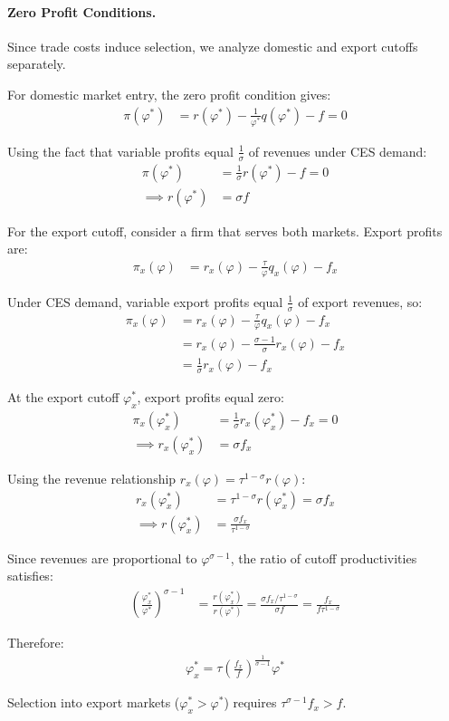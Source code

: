 \begin{solution}
	\paragraph{Zero Profit Conditions.} Since trade costs induce selection, we analyze domestic and export cutoffs separately.

	For domestic market entry, the zero profit condition gives:
	\begin{align*}
		\pi(\varphi^*) &= r(\varphi^*) - \frac{1}{\varphi^*} q(\varphi^*) - f = 0
	\end{align*}

	Using the fact that variable profits equal $\frac{1}{\sigma}$ of revenues under CES demand:
	\begin{align*}
		\pi(\varphi^*) &= \frac{1}{\sigma} r(\varphi^*) - f = 0 \\
		\implies r(\varphi^*) &= \sigma f
	\end{align*}

	For the export cutoff, consider a firm that serves both markets. Export profits are:
	\begin{align*}
		\pi_x(\varphi) &= r_x(\varphi) - \frac{\tau}{\varphi} q_x(\varphi) - f_x
	\end{align*}

	Under CES demand, variable export profits equal $\frac{1}{\sigma}$ of export revenues, so:
	\begin{align*}
		\pi_x(\varphi) &= r_x(\varphi) - \frac{\tau}{\varphi} q_x(\varphi) - f_x \\
		&= r_x(\varphi) - \frac{\sigma-1}{\sigma} r_x(\varphi) - f_x \\
		&= \frac{1}{\sigma} r_x(\varphi) - f_x
	\end{align*}

	At the export cutoff $\varphi_x^*$, export profits equal zero:
	\begin{align*}
		\pi_x(\varphi_x^*) &= \frac{1}{\sigma} r_x(\varphi_x^*) - f_x = 0 \\
		\implies r_x(\varphi_x^*) &= \sigma f_x
	\end{align*}

	Using the revenue relationship $r_x(\varphi) = \tau^{1-\sigma} r(\varphi)$:
	\begin{align*}
		r_x(\varphi_x^*) &= \tau^{1-\sigma} r(\varphi_x^*) = \sigma f_x \\
		\implies r(\varphi_x^*) &= \frac{\sigma f_x}{\tau^{1-\sigma}}
	\end{align*}

	Since revenues are proportional to $\varphi^{\sigma-1}$, the ratio of cutoff productivities satisfies:
	\begin{align*}
		\left( \frac{\varphi_x^*}{\varphi^*} \right)^{\sigma-1} &= \frac{r(\varphi_x^*)}{r(\varphi^*)} = \frac{\sigma f_x / \tau^{1-\sigma}}{\sigma f} = \frac{f_x}{f \tau^{1-\sigma}}
	\end{align*}

	Therefore:
	\begin{align*}
		\varphi_x^* = \tau \left( \frac{f_x}{f} \right)^{\frac{1}{\sigma-1}} \varphi^*
	\end{align*}

	Selection into export markets ($\varphi_x^* > \varphi^*$) requires $\tau^{\sigma-1} f_x > f$.
	\end{solution}
